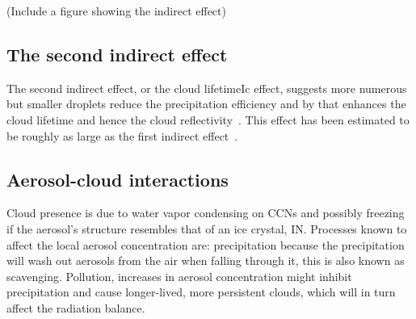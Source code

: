 (Include a figure showing the indirect effect)

\subsection{The second indirect effect}

The second indirect effect, or the cloud lifetimeIc effect, suggests more numerous but smaller droplets reduce the precipitation efficiency and by that enhances the cloud lifetime and hence the cloud reflectivity~\citep{Albrecht1989}. This effect has been estimated to be roughly as large as the first indirect effect~\citep{Lohmann2005}.

\subsection{Aerosol-cloud interactions}

Cloud presence is due to water vapor condensing on CCNs and possibly freezing if the aerosol's structure resembles that of an ice crystal, IN. Processes known to affect the local aerosol concentration are: precipitation because the precipitation will wash out aerosols from the air when falling through it, this is also known as scavenging. Pollution, increases in aerosol concentration might inhibit precipitation and cause longer-lived, more persistent clouds, which will in turn affect the radiation balance.


 